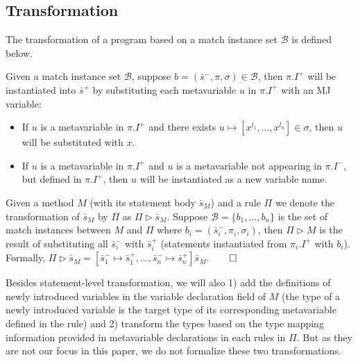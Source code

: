 \documentclass[letterpaper, USenglish]{lipics-v2016}
\theoremstyle{plain}
\begin{document}
\subsection{Transformation} 
The transformation of a program based on a match instance set $\mathcal{B}$ is defined below.


\begin{definition}
\label{def:pattern_instantiation}
Given a match instance set $\mathcal{B}$, suppose
$b=(\bar{s}^-,\pi,\sigma)\in \mathcal{B}$, then $\pi.I^+$ will be
instantiated into $\bar{s}^+$ by substituting each metavariable $u$ in $\pi.I^+$ with an MJ variable:
\begin{itemize}
\item If $u$ is a metavariable in $\pi.I^+$ and there exists $u\mapsto[x^{l_1},...,x^{l_n}]\in \sigma$, then $u$ will be substituted with $x$.
\item If $u$ is a metavariable in $\pi.I^+$ and $u$ is a metavariable not appearing in $\pi.I^-$, but defined in $\pi.I^+$, then $u$ will be instantiated as a new variable name.
\end{itemize}
\end{definition}

\begin{definition} Given a method $M$
  (with its statement body $\bar{s}_M$) and a rule $\Pi$ we denote the
  transformation of $\bar{s}_M$ by $\Pi$ as $\Pi\triangleright
  \bar{s}_M$. Suppose $\mathcal{B}=\{b_1,...,b_n\}$ is the set of
  match instances between $M$ and $\Pi$ where
  $b_i=(\bar{s}^-_i,\pi_i,\sigma_i)$, then $\Pi\triangleright M$ is
  the result of substituting all $\bar{s}_i^-$ with $\bar{s}_i^+$ (statements instantiated from $\pi_i.I^+$ with $b_i$). Formally, $\Pi\triangleright \bar{s}_M=[\bar{s}_1^-\mapsto \bar{s}_1^+,...,\bar{s}_n^{-}\mapsto\bar{s}_n^+]\bar{s}_M$.\hfill $\qed$
\end{definition}

Besides statement-level transformation, we will also 1) add the definitions of newly introduced variables in the variable declaration field of $M$ (the type of a newly introduced variable is the target type of its corresponding metavariable defined in the rule) and 2) transform the types based on the type mapping information provided in metavariable declarations in each rules in $\Pi$. But as they are not our focus in this paper, we do not formalize these two transformations.
\end{document}
